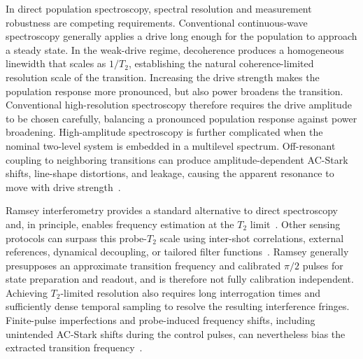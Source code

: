 In direct population spectroscopy, spectral resolution and measurement
robustness are competing requirements. Conventional continuous-wave
spectroscopy generally applies a drive long enough for the population to
approach a steady state. In the weak-drive regime, decoherence produces a
homogeneous linewidth that scales as $1/T_2$, establishing the natural
coherence-limited resolution scale of the transition. Increasing the drive
strength makes the population response more pronounced, but also power broadens
the transition. Conventional high-resolution spectroscopy therefore requires
the drive amplitude to be chosen carefully, balancing a pronounced population
response against power broadening.
High-amplitude spectroscopy is further complicated when the nominal two-level
system is embedded in a multilevel spectrum. Off-resonant coupling to
neighboring transitions can produce amplitude-dependent AC-Stark shifts,
line-shape distortions, and leakage, causing the apparent resonance to move
with drive strength~\cite{PhysRevA.76.042319,motzoi_drag_2009,gambetta_analytic_2011}.






Ramsey interferometry provides a standard alternative to direct spectroscopy and, in principle, enables frequency estimation at the $T_2$ limit~\cite{PhysRev.78.695}. Other sensing protocols can surpass this probe-$T_2$ scale using inter-shot correlations, external references, dynamical decoupling, or tailored filter functions~\cite{PhysRevLett.122.060503,retzker_2,Cao_2025,gefen_clock_2016,bylander_2011,iosue_filter_2026}. Ramsey generally presupposes an approximate transition frequency and calibrated $\pi/2$ pulses for state preparation and readout, and is therefore not fully calibration independent. Achieving $T_2$-limited resolution also requires long interrogation times and sufficiently dense temporal sampling to resolve the resulting interference fringes. Finite-pulse imperfections and probe-induced frequency shifts, including unintended AC-Stark shifts during the control pulses, can nevertheless bias the extracted transition frequency~\cite{PhysRevA.98.053424,shuker_ramsey_2019}.






